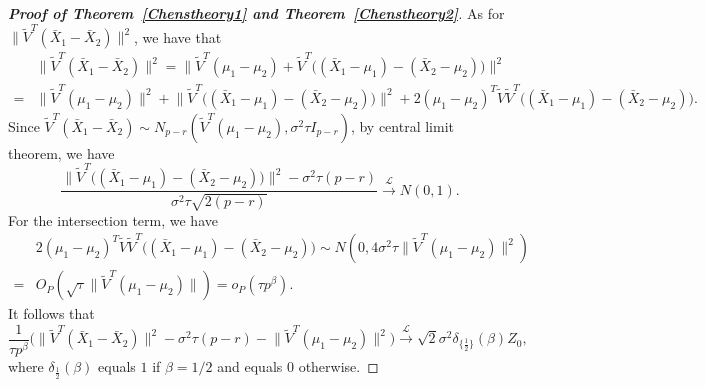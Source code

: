 \documentclass[review]{elsarticle}
\theoremstyle{plain}
\theoremstyle{definition}
\theoremstyle{remark}
\begin{document}
\begin{proof}[\textbf{Proof of Theorem~\ref{Chenstheory1} and Theorem~\ref{Chenstheory2}}]
    As for $\|\tilde{V}^T(\bar{X}_1-\bar{X}_2)\|^2$, we have that
        $$
        \begin{aligned}
            &\|\tilde{V}^T(\bar{X}_1-\bar{X}_2)\|^2
            =\big\|\tilde{V}^T(\mu_1-\mu_2)+\tilde{V}^T\big((\bar{X}_1-\mu_1)-(\bar{X}_2-\mu_2)\big)\big\|^2\\
            =&\|\tilde{V}^T(\mu_1-\mu_2)\|^2+
            \big\|\tilde{V}^T\big((\bar{X}_1-\mu_1)-(\bar{X}_2-\mu_2)\big)\big\|^2+
            2{(\mu_1-\mu_2)}^T\tilde{V}\tilde{V}^T\big((\bar{X}_1-\mu_1)-(\bar{X}_2-\mu_2)\big).
        \end{aligned}
        $$
Since $\tilde{V}^T (\bar{X}_1-\bar{X}_2)\sim N_{p-r}(\tilde{V}^T (\mu_1-\mu_2),  \sigma^2 \tau I_{p-r})$, by central limit theorem, we have
    $$
\frac{
    \big\|\tilde{V}^T\big((\bar{X}_1-\mu_1)-(\bar{X}_2-\mu_2)\big)\big\|^2-\sigma^2 \tau (p-r)}{\sigma^2 \tau\sqrt{2(p-r)}}\xrightarrow{\mathcal{L}} N(0,1).
    $$
    For the intersection term, we have
    \begin{equation*}
        \begin{aligned}
            &2{(\mu_1-\mu_2)}^T\tilde{V}\tilde{V}^T\big((\bar{X}_1-\mu_1)-(\bar{X}_2-\mu_2)\big)
            \sim N(0,4\sigma^2 \tau \|\tilde{V}^T(\mu_1-\mu_2)\|^2)\\
            =& O_P(\sqrt{\tau}\|\tilde{V}^T(\mu_1-\mu_2)\| )=o_P(\tau p^{\beta}).
        \end{aligned}
    \end{equation*}
    It follows that
    \begin{equation}\label{eq:kkk3}
\frac{1}{\tau p^\beta}
    \big(\big\|\tilde{V}^T(\bar{X}_1-\bar{X}_2)\big\|^2-\sigma^2 \tau (p-r)-\big\|\tilde{V}^T(\mu_1-\mu_2)\big\|^2\big)
    \xrightarrow{\mathcal{L}} 
        \sqrt{2}\sigma^2 \delta_{\{\frac{1}{2}\}}(\beta)Z_0,
    \end{equation}
    where $\delta_{\frac{1}{2}}(\beta)$ equals $1$ if $\beta=1/2$ and equals $0$ otherwise.



\end{proof}
\end{document}
